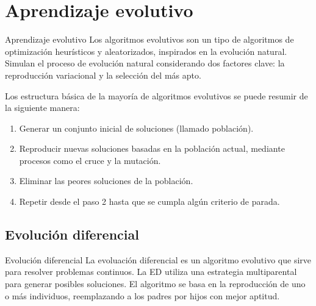 \documentclass[
  11,
  ignorenonframetext,
  aspectratio=169,
  xcolor=table,
]{beamer}
\begin{document}
\section{Aprendizaje evolutivo}
\begin{frame}{Aprendizaje evolutivo}
  \protect\hypertarget{aprendizaje-evolutivo}{}
  Los algoritmos evolutivos son un tipo de algoritmos de optimización
  heurísticos y aleatorizados, inspirados en la evolución natural. Simulan
  el proceso de evolución natural considerando dos factores clave: la
  reproducción variacional y la selección del más apto. \cite{zhou-2019}

  Los estructura básica de la mayoría de algoritmos evolutivos se puede
  resumir de la siguiente manera:

  \begin{enumerate}
    \item Generar un conjunto inicial de soluciones (llamado población).
    \item Reproducir nuevas soluciones basadas en la población actual, mediante procesos como el cruce y la mutación.
    \item Eliminar las peores soluciones de la población.
    \item Repetir desde el paso 2 hasta que se cumpla algún criterio de parada.
  \end{enumerate}
\end{frame}

\subsection{Evolución diferencial}
\begin{frame}{Evolución diferencial}
  \protect\hypertarget{evoluciuxf3n-diferencial}{}
  La evoluación diferencial es un algoritmo evolutivo que sirve para
  resolver problemas continuos. La ED utiliza una estrategia multiparental
  para generar posibles soluciones. El algoritmo se basa en la
  reproducción de uno o más individuos, reemplazando a los padres por
  hijos con mejor aptitud. \cite{du-2016}
\end{frame}
\end{document}
